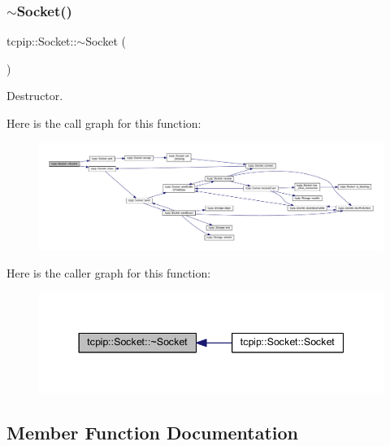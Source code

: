 \subsubsection{\texorpdfstring{$\sim$\+Socket()}{~Socket()}}
{\footnotesize\ttfamily tcpip\+::\+Socket\+::$\sim$\+Socket (\begin{DoxyParamCaption}{ }\end{DoxyParamCaption})}



Destructor. 

Here is the call graph for this function\+:\nopagebreak
\begin{figure}[H]
\begin{center}
\leavevmode
\includegraphics[width=350pt]{classtcpip_1_1_socket_a610c213f4b2fad07cc0bfddc3a5577e4_cgraph}
\end{center}
\end{figure}
Here is the caller graph for this function\+:\nopagebreak
\begin{figure}[H]
\begin{center}
\leavevmode
\includegraphics[width=344pt]{classtcpip_1_1_socket_a610c213f4b2fad07cc0bfddc3a5577e4_icgraph}
\end{center}
\end{figure}


\subsection{Member Function Documentation}
\mbox{\label{classtcpip_1_1_socket_a7847299f806a73798f4ceb95ab0e3d51}} 
